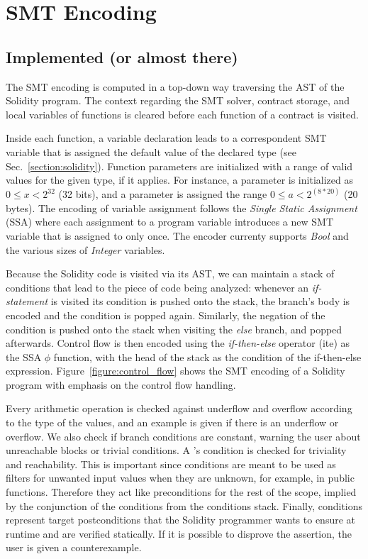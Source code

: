 \section{SMT Encoding}
\label{section:smt}

\subsection{Implemented (or almost there)}

The SMT encoding is computed in a top-down way traversing the AST of the
Solidity program.  The context regarding the SMT solver, contract storage, and
local variables of functions is cleared before each function of a contract is
visited.

Inside each function, a variable declaration leads to a correspondent SMT
variable that is assigned the default value of the declared type (see
Sec.~\ref{section:solidity}).
%
Function parameters are initialized with a range of valid values for the given
type, if it applies.  For instance, a parameter  is initialized
as $0 \le x < 2^{32}$ (32 bits), and a parameter  is assigned
the range $0 \le a < 2^{(8*20)}$ (20 bytes).
%
The encoding of variable assignment follows the \emph{Single Static Assignment}
(SSA) where each assignment to a program variable introduces a new SMT variable
that is assigned to only once.
%
The encoder currenty supports \emph{Bool} and the various sizes of
\emph{Integer} variables.

Because the Solidity code is visited via its AST, we can maintain a stack of
conditions that lead to the piece of code being analyzed: whenever an
\emph{if-statement} is visited its condition is pushed onto the stack, the
branch's body is encoded and the condition is popped again.
%
Similarly, the negation of the condition is pushed onto the stack when visiting
the \emph{else} branch, and popped afterwards.
%
Control flow is then encoded using the \emph{if-then-else} operator (ite) as
the SSA $\phi$ function, with the head of the stack as the condition of the
if-then-else expression.
%
Figure~\ref{figure:control_flow} shows the SMT encoding of a Solidity program
with emphasis on the control flow handling.

Every arithmetic operation is checked against underflow and overflow according
to the type of the values, and an example is given if there is an underflow or
overflow.
%
We also check if branch conditions are constant, warning the user about
unreachable blocks or trivial conditions.
%
A 's condition is checked for triviality and reachability.
%
This is important since  conditions are meant to be used as
filters for unwanted input values when they are unknown, for example, in public
functions.
%
Therefore they act like preconditions for the rest of the scope, implied by the
conjunction of the conditions from the conditions stack.
%
Finally,  conditions represent target postconditions that the
Solidity programmer wants to ensure at runtime and are verified statically.
%
If it is possible to disprove the assertion, the user is given a
counterexample.

